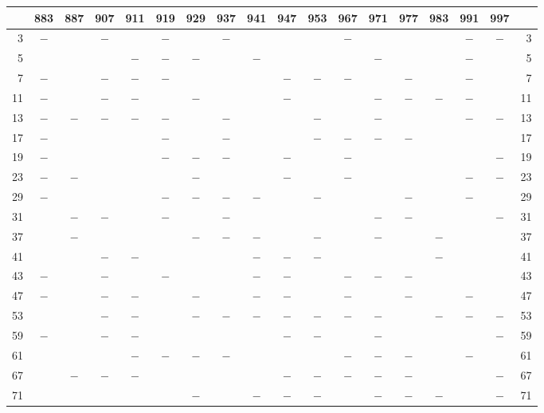 \begin{center}\begingroup\fontsize{8}{10.5}\selectfont\setlength{\tabcolsep}{2pt}
\begin{tabular}{r|c|c|c|c|c|c|c|c|c|c|c|c|c|c|c|c|r}
\hline
 & 883 & 887 & 907 & 911 & 919 & 929 & 937 & 941 & 947 & 953 & 967 & 971 & 977 & 983 & 991 & 997 & \\
\hline
3 & $-$ &  & $-$ &  & $-$ &  & $-$ &  &  &  & $-$ &  &  &  & $-$ & $-$ & 3\\
5 &  &  &  & $-$ & $-$ & $-$ &  & $-$ &  &  &  & $-$ &  &  & $-$ &  & 5\\
7 & $-$ &  & $-$ & $-$ & $-$ &  &  &  & $-$ & $-$ & $-$ &  & $-$ &  & $-$ &  & 7\\
11 & $-$ &  & $-$ & $-$ &  & $-$ &  &  & $-$ &  &  & $-$ & $-$ & $-$ & $-$ &  & 11\\
13 & $-$ & $-$ & $-$ & $-$ & $-$ &  & $-$ &  &  & $-$ &  & $-$ &  &  & $-$ & $-$ & 13\\
17 & $-$ &  &  &  & $-$ &  & $-$ &  &  & $-$ & $-$ & $-$ & $-$ &  &  &  & 17\\
19 & $-$ &  &  &  & $-$ & $-$ & $-$ &  & $-$ &  & $-$ &  &  &  &  & $-$ & 19\\
23 & $-$ & $-$ &  &  &  & $-$ &  &  & $-$ &  & $-$ &  &  &  & $-$ & $-$ & 23\\
29 & $-$ &  &  &  & $-$ & $-$ & $-$ & $-$ &  & $-$ &  &  & $-$ &  & $-$ &  & 29\\
31 &  & $-$ & $-$ &  & $-$ &  & $-$ &  &  &  &  & $-$ & $-$ &  &  & $-$ & 31\\
37 &  & $-$ &  &  &  & $-$ & $-$ & $-$ &  & $-$ &  & $-$ &  & $-$ &  &  & 37\\
41 &  &  & $-$ & $-$ &  &  &  & $-$ & $-$ & $-$ &  &  &  & $-$ &  &  & 41\\
43 & $-$ &  & $-$ &  & $-$ &  &  & $-$ & $-$ &  & $-$ & $-$ & $-$ &  &  &  & 43\\
47 & $-$ &  & $-$ & $-$ &  & $-$ &  & $-$ & $-$ &  & $-$ &  & $-$ &  & $-$ &  & 47\\
53 &  &  & $-$ & $-$ &  & $-$ & $-$ & $-$ & $-$ & $-$ & $-$ & $-$ &  & $-$ & $-$ & $-$ & 53\\
59 & $-$ &  & $-$ & $-$ &  &  &  &  & $-$ & $-$ &  & $-$ &  &  &  & $-$ & 59\\
61 &  &  &  & $-$ & $-$ & $-$ & $-$ &  &  &  & $-$ & $-$ & $-$ &  & $-$ &  & 61\\
67 &  & $-$ & $-$ & $-$ &  &  &  &  & $-$ & $-$ & $-$ & $-$ & $-$ &  &  & $-$ & 67\\
71 &  &  &  &  &  & $-$ &  & $-$ & $-$ & $-$ &  & $-$ & $-$ & $-$ &  & $-$ & 71\\

\end{tabular}
\end{center}
